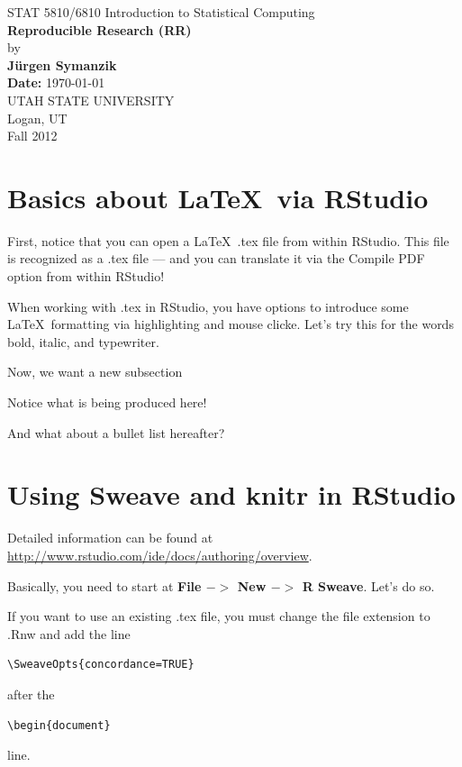 \documentclass[12pt]{article}
\begin{document}
\begin{titlepage}

\begin{center}
{\large STAT 5810/6810 Introduction to Statistical Computing} \\[4cm]

{\LARGE \bf Reproducible Research (RR)} \\[1cm]
by \\[0.5cm]
{\bf J\"urgen Symanzik} \\[2.5cm]
{\bf Date:} \today \\[2cm]

UTAH STATE UNIVERSITY \\[0.5cm]
Logan, UT \\[0.5cm]
Fall 2012 \\[0.5cm]
\end{center}

\thispagestyle{empty}
\vfill
\end{titlepage}


\newpage 



\tableofcontents


\newpage



\section{Basics about \LaTeX\ via RStudio}

First, notice that you can open a \LaTeX\ .tex file from within RStudio.
This file is recognized as a .tex file --- and you can translate it 
via the Compile PDF option from within RStudio!

When working with .tex in RStudio, you have options to introduce
some \LaTeX\ formatting via highlighting and mouse clicke. Let's
try this for the words bold, italic, and typewriter.


Now, we want a new subsection

Notice what is being produced here!



And what about a bullet list hereafter?



\section{Using Sweave and knitr in RStudio}

Detailed information can be found at
\url{http://www.rstudio.com/ide/docs/authoring/overview}.

Basically, you need to start at \textbf{File $->$ New $->$ R Sweave}.
Let's do so.


If you want to use an existing .tex file, you must change the file
extension to .Rnw and add the line
\begin{verbatim}
\SweaveOpts{concordance=TRUE}
\end{verbatim}
after the 
\begin{verbatim}
\begin{document}
\end{verbatim}
line.
 
\end{document}
